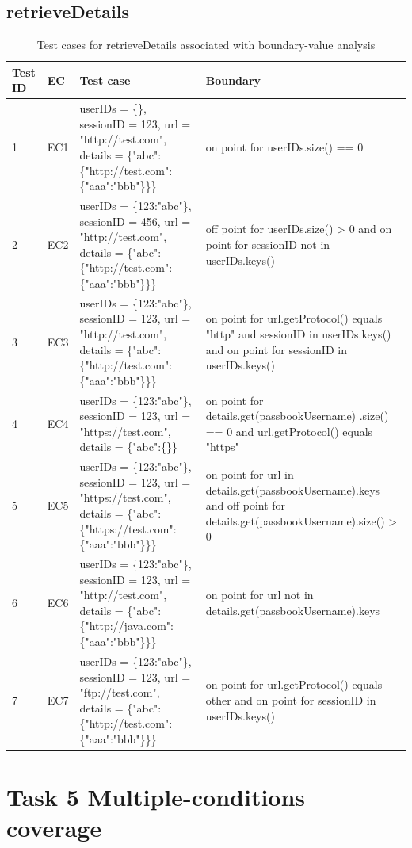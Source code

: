 \documentclass{article}
\begin{document}
\subsection{retrieveDetails}
\begin{longtable}{|p{0.5cm}|p{0.5cm}|p{7cm}|p{5cm}|}
\caption{Test cases for retrieveDetails associated with boundary-value analysis}\\
\hline 
Test ID&EC&Test case&Boundary\\
\hline  
1&EC1&userIDs = \{\}, sessionID = 123, url = "http://test.com", details = \{"abc":\{"http://test.com":\{"aaa":"bbb"\}\}\}&on point for userIDs.size() == 0\\
\hline
2&EC2&userIDs = \{123:"abc"\}, sessionID = 456, url = "http://test.com", details = \{"abc":\{"http://test.com":\{"aaa":"bbb"\}\}\}&off point for userIDs.size() > 0 and on point for sessionID not in userIDs.keys()\\
\hline
3&EC3&userIDs = \{123:"abc"\}, sessionID = 123, url = "http://test.com", details = \{"abc":\{"http://test.com":\{"aaa":"bbb"\}\}\}& on point for url.getProtocol() equals "http" and sessionID in userIDs.keys() and on point for sessionID in userIDs.keys()\\
\hline
4&EC4&userIDs = \{123:"abc"\}, sessionID = 123, url = "https://test.com", details = \{"abc":\{\}\}&on point for details.get(passbookUsername) .size() == 0 and url.getProtocol() equals "https"\\
\hline
5&EC5&userIDs = \{123:"abc"\}, sessionID = 123, url = "https://test.com", details = \{"abc":\{"https://test.com":\{"aaa":"bbb"\}\}\}&on point for url in details.get(passbookUsername).keys and off point for details.get(passbookUsername).size() > 0\\
\hline
6&EC6&userIDs = \{123:"abc"\}, sessionID = 123, url = "http://test.com", details = \{"abc":\{"http://java.com":\{"aaa":"bbb"\}\}\}&on point for url not in details.get(passbookUsername).keys\\
\hline
7&EC7&userIDs = \{123:"abc"\}, sessionID = 123, url = "ftp://test.com", details = \{"abc":\{"http://test.com":\{"aaa":"bbb"\}\}\}&on point for url.getProtocol() equals other and on point for sessionID in userIDs.keys()\\
\hline
\end{longtable}



\section{Task 5 Multiple-conditions coverage}
\end{document}
